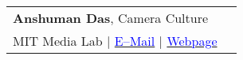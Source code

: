 \documentclass[margin,line]{res}
\begin{document}
\begin{resume}
\begin{tabular}{@{}p{3in}p{3in}}
\textbf{Anshuman Das}, Camera Culture & \\ %
MIT Media Lab $|$ \href{mailto:ajdas@mit.edu}{\textcolor{blue}{E--Mail}} $|$ \href{http://ajdas.scripts.mit.edu/ajdas/}{\textcolor{blue}{Webpage}} & \\ %
\end{tabular}
%
%


\end{resume}
\end{document}
